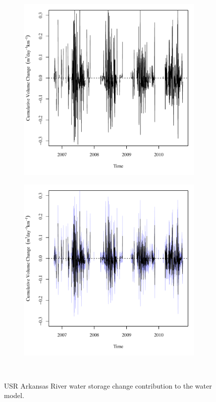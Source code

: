 \begin{figure}[htbp]
\centering
	\begin{subfigure}{0.5\textwidth}
		\centering
		\includegraphics[width=0.9\linewidth]{"Figures/Results_USR/Deterministic/Balance Water - storage"}
		\label{sub:USRWaterStoreD}
	\end{subfigure}%
	\begin{subfigure}{0.5\textwidth}
		\centering
		\includegraphics[width=0.9\linewidth]{"Figures/Results_USR/Stochastic/Balance Water - storage"}
		\label{sub:USRWaterStoreS}
	\end{subfigure}\\
	\caption[USR Arkansas River water storage change contribution to the water model.]{USR Arkansas River water storage change contribution to the water model.}
	\label{fig:USRWaterStore}
\end{figure}

